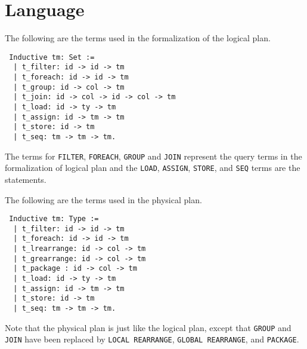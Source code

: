 \section{Language}
\label{sec:syntax}

The following are the terms used in the formalization of the logical plan.

\begin{lstlisting}
 Inductive tm: Set :=
  | t_filter: id -> id -> tm
  | t_foreach: id -> id -> tm
  | t_group: id -> col -> tm
  | t_join: id -> col -> id -> col -> tm
  | t_load: id -> ty -> tm
  | t_assign: id -> tm -> tm
  | t_store: id -> tm
  | t_seq: tm -> tm -> tm.
\end{lstlisting}

The terms for \texttt{FILTER}, \texttt{FOREACH}, \texttt{GROUP} and \texttt{JOIN} represent the query terms in the formalization of logical plan and the \texttt{LOAD}, \texttt{ASSIGN}, \texttt{STORE}, and \texttt{SEQ} terms are the statements.

The following are the terms used in the physical plan.

\begin{lstlisting}
 Inductive tm: Type :=
  | t_filter: id -> id -> tm
  | t_foreach: id -> id -> tm
  | t_lrearrange: id -> col -> tm
  | t_grearrange: id -> col -> tm
  | t_package : id -> col -> tm
  | t_load: id -> ty -> tm
  | t_assign: id -> tm -> tm
  | t_store: id -> tm
  | t_seq: tm -> tm -> tm.
\end{lstlisting}

Note that the physical plan is just like the logical plan, except that \texttt{GROUP} and \texttt{JOIN} have been replaced by \texttt{LOCAL REARRANGE},
\texttt{GLOBAL REARRANGE}, and \texttt{PACKAGE}.

